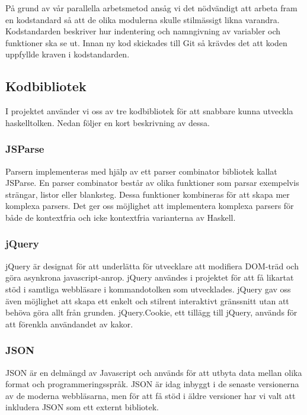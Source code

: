 På grund av vår parallella arbetsmetod ansåg vi det nödvändigt att arbeta fram en kodstandard så att de olika modulerna skulle stilmässigt likna varandra. Kodstandarden beskriver hur indentering och namngivning av variabler och funktioner ska se ut. Innan ny kod skickades till Git så krävdes det att koden uppfyllde kraven i kodstandarden.  


\subsection{Kodbibliotek}
I projektet använder vi oss av tre kodbibliotek för att snabbare kunna utveckla haskelltolken. Nedan följer en kort beskrivning av dessa.

\subsubsection{JSParse}  
Parsern implementeras med hjälp av ett parser combinator bibliotek kallat JSParse. 
En parser combinator består av olika funktioner som parsar exempelvis strängar, listor eller blanksteg.
Dessa funktioner kombineras för att skapa mer komplexa parsers. Det ger oss möjlighet att implementera komplexa
parsers för både de kontextfria och icke kontextfria varianterna av Haskell.

\subsubsection{jQuery} 
jQuery är designat för att underlätta för utvecklare att modifiera DOM-träd och göra asynkrona javascript-anrop. jQuery användes i projektet för att få likartat stöd i samtliga webbläsare i kommandotolken som utvecklades. 
jQuery gav oss även möjlighet att skapa ett enkelt och stilrent interaktivt gränssnitt utan att behöva göra allt från grunden.
jQuery.Cookie, ett tillägg till jQuery, används för att förenkla användandet av kakor.

\subsubsection{JSON}
JSON \citep{json}  är en delmängd av Javascript och används för att utbyta data mellan olika format och programmeringsspråk. 
JSON är idag inbyggt i de senaste versionerna av de moderna webbläsarna, men för att få stöd i äldre versioner har vi valt att inkludera JSON som ett externt bibliotek.

